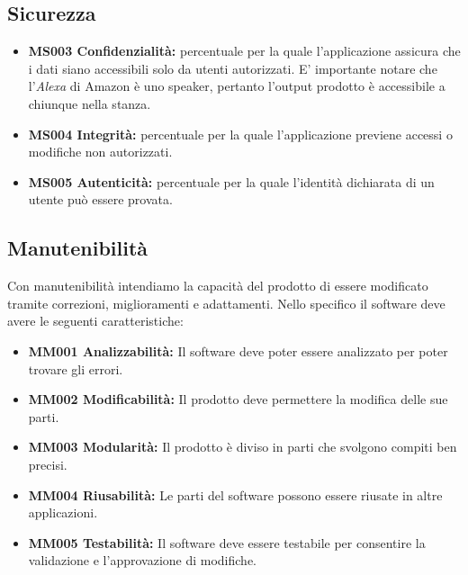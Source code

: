 \subsection{Sicurezza}
\begin{itemize}
	\item \textbf{MS003 Confidenzialità:} percentuale per la quale l'applicazione assicura che i dati siano accessibili solo da utenti autorizzati. E' importante notare che l'\textit{Alexa} di Amazon è uno speaker, pertanto l'output prodotto è accessibile a chiunque nella stanza.
	\item \textbf{MS004 Integrità:} percentuale per la quale l'applicazione previene accessi o modifiche non autorizzati.
	\item \textbf{MS005 Autenticità:} percentuale per la quale l'identità dichiarata di un utente può essere provata.
\end{itemize}
\subsection{Manutenibilità}
Con manutenibilità intendiamo la capacità del prodotto di essere modificato tramite correzioni, miglioramenti e adattamenti.
Nello specifico il software deve avere le seguenti caratteristiche:
\begin{itemize}
	\item \textbf{MM001 Analizzabilità:} Il software deve poter essere analizzato per poter trovare gli errori.
	\item \textbf{MM002 Modificabilità:} Il prodotto deve permettere la modifica delle sue parti.
	\item \textbf{MM003 Modularità:} Il prodotto è diviso in parti che svolgono compiti ben precisi.
	\item \textbf{MM004 Riusabilità:} Le parti del software possono essere riusate in altre applicazioni.
	\item \textbf{MM005 Testabilità:} Il software deve essere testabile per consentire la validazione e l'approvazione di modifiche.
\end{itemize}
